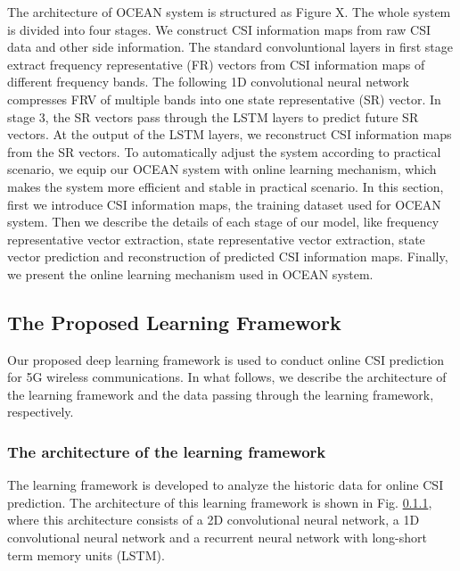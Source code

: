 \documentclass[10pt,conference,letterpaper]{IEEEtran}
\begin{document}
The architecture of OCEAN system is structured as Figure X. The whole system is divided into four stages. We construct CSI information maps from raw CSI data and other side information. The standard convoluntional layers in first stage extract frequency representative (FR) vectors from CSI information maps of different frequency bands. The following 1D convolutional neural network compresses FRV of multiple bands into one state representative (SR) vector. In stage 3, the SR vectors pass through the LSTM layers to predict future SR vectors. At the output of the LSTM layers, we reconstruct CSI information maps from the SR vectors. To automatically adjust the system according to practical scenario, we equip our OCEAN system with online learning mechanism, which makes the system more efficient and stable in practical scenario. In this section, first we introduce CSI information maps, the training dataset used for OCEAN system. Then  we describe the details of each stage of our model, like frequency representative vector extraction, state representative vector extraction, state vector prediction and reconstruction of predicted CSI information maps. Finally, we present the online learning mechanism used in OCEAN system. 

\subsection{The Proposed Learning Framework}
\label{subsec:proposed-network}

Our proposed deep learning framework is used to conduct online CSI prediction for 5G wireless communications. In what follows, we describe the architecture of the learning framework and the data passing through the learning framework, respectively.


\subsubsection{The architecture of the learning framework}

The learning framework is developed to analyze the historic data for online CSI prediction. The architecture of this learning framework is shown in Fig. \ref{}, where this architecture consists of a 2D convolutional neural network, a 1D convolutional neural network and a recurrent neural network with long-short term memory units (LSTM).
\end{document}
